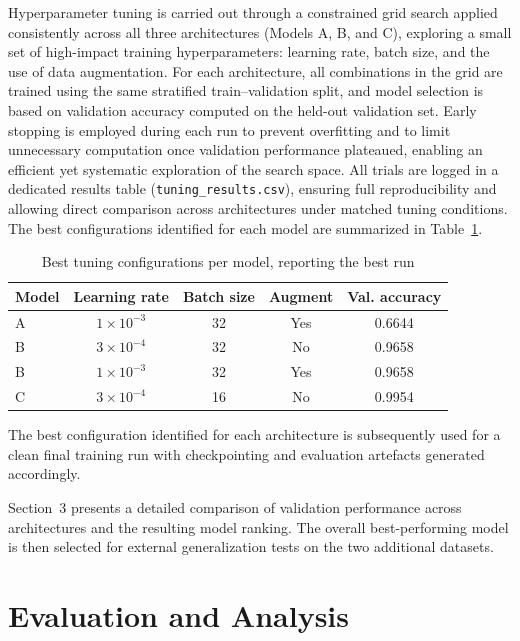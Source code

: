 \documentclass{article}
\begin{document}
Hyperparameter tuning is carried out through a constrained grid search 
applied consistently across all three architectures (Models A, B, and C), 
exploring a small set of high-impact training hyperparameters: learning 
rate, batch size, and the use of data augmentation. For each architecture, 
all combinations in the grid are trained using the same stratified 
train--validation split, and model selection is based on validation 
accuracy computed on the held-out validation set. Early stopping is 
employed during each run to prevent overfitting and to limit unnecessary 
computation once validation performance plateaued, enabling an efficient 
yet systematic exploration of the search space. All trials are logged in 
a dedicated results table (\texttt{tuning\_results.csv}), ensuring full 
reproducibility and allowing direct comparison across architectures under 
matched tuning conditions. The best configurations identified for each model 
are summarized in Table~\ref{tab:tuning_best_configs}.

\begin{table}[h]
\centering
\caption{Best tuning configurations per model, reporting the best run}
\label{tab:tuning_best_configs}
\begin{tabular}{lccc c}
\hline
Model & Learning rate & Batch size & Augment & Val. accuracy \\
\hline
A & $1 \times 10^{-3}$ & 32 & Yes & 0.6644 \\
B & $3 \times 10^{-4}$ & 32 & No  & 0.9658 \\
B & $1 \times 10^{-3}$ & 32 & Yes & 0.9658 \\
C & $3 \times 10^{-4}$ & 16 & No  & 0.9954 \\
\hline
\end{tabular}
\end{table}

The best configuration identified for each architecture is subsequently 
used for a clean final training run with checkpointing and evaluation 
artefacts generated accordingly. 

Section~3 presents a detailed comparison of validation performance across 
architectures and the resulting model ranking. 
The overall best-performing model is then selected for external 
generalization tests on the two additional datasets.

\section{Evaluation and Analysis}
\end{document}
